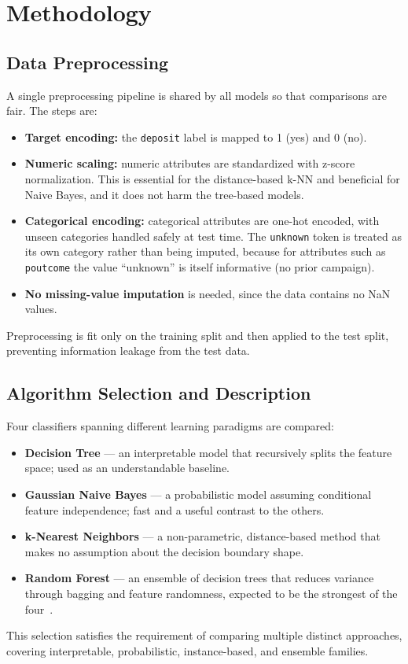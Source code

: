 \documentclass[conference]{IEEEtran}
\begin{document}
	\section{Methodology}
	\label{sec:methodology}

	\subsection{Data Preprocessing}
	A single preprocessing pipeline is shared by all models so that comparisons are
	fair. The steps are:
	\begin{itemize}
		\item \textbf{Target encoding:} the \texttt{deposit} label is mapped to
		1 (yes) and 0 (no).
		\item \textbf{Numeric scaling:} numeric attributes are standardized with
		z-score normalization. This is essential for the distance-based k-NN and
		beneficial for Naive Bayes, and it does not harm the tree-based models.
		\item \textbf{Categorical encoding:} categorical attributes are one-hot
		encoded, with unseen categories handled safely at test time. The
		\texttt{unknown} token is treated as its own category rather than being
		imputed, because for attributes such as \texttt{poutcome} the value
		``unknown'' is itself informative (no prior campaign).
		\item \textbf{No missing-value imputation} is needed, since the data
		contains no NaN values.
	\end{itemize}
	Preprocessing is fit only on the training split and then applied to the test
	split, preventing information leakage from the test data.

	\subsection{Algorithm Selection and Description}
	Four classifiers spanning different learning paradigms are compared:
	\begin{itemize}
		\item \textbf{Decision Tree} --- an interpretable model that recursively
		splits the feature space; used as an understandable baseline.
		\item \textbf{Gaussian Naive Bayes} --- a probabilistic model assuming
		conditional feature independence; fast and a useful contrast to the others.
		\item \textbf{k-Nearest Neighbors} --- a non-parametric, distance-based
		method that makes no assumption about the decision boundary shape.
		\item \textbf{Random Forest} --- an ensemble of decision trees that reduces
		variance through bagging and feature randomness, expected to be the
		strongest of the four~\cite{b_breiman}.
	\end{itemize}
	This selection satisfies the requirement of comparing multiple distinct
	approaches, covering interpretable, probabilistic, instance-based, and ensemble
	families.
\end{document}
